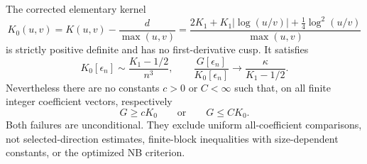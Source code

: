 \begin{proposition}
\label{prop:ns70-repaired-background}
The corrected elementary kernel
\begin{equation}
 K_0(u,v)=K(u,v)-\frac d{\max(u,v)}
 =\frac{2K_1+K_1|\log(u/v)|+\tfrac14\log^2(u/v)}{\max(u,v)}
 \label{eq:ns70-repair}
\end{equation}
is strictly positive definite and has no first-derivative cusp.
It satisfies
\[
 K_0[\epsilon_n]\sim\frac{K_1-1/2}{n^3},\qquad
 \frac{G[\epsilon_n]}{K_0[\epsilon_n]}
                \longrightarrow\frac\kappa{K_1-1/2}.
\]
Nevertheless there are no constants $c>0$ or $C<\infty$ such that,
on all finite integer coefficient vectors, respectively
\[
 G\geq cK_0\qquad\text{or}\qquad G\leq CK_0.
\]
Both failures are unconditional. They exclude uniform all-coefficient
comparisons, not selected-direction estimates, finite-block inequalities
with size-dependent constants, or the optimized NB criterion.
\end{proposition}
